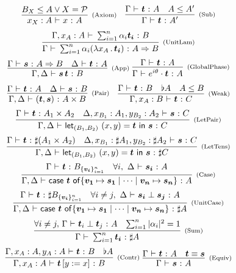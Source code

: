 \documentclass[runningheads,orivec]{llncs}
\newcommand\AbsBasis{\ensuremath{\mathcal{P}}}
\def\Pair#1#2{(#1,#2)} %
\def\Lam#1#2#3{\lambda#1_{#2}\,{.}\,#3} %
\def\letkeyword{\mathsf{let}}
\def\inkeyword{\mathsf{in}}
\def\LetP#1#2#3#4#5#6{\letkeyword_{\Pair{#2}{#4}}~\Pair{#1}{#3}=#5~\inkeyword~#6}
\def\gencase#1#2#3#4#5{\ensuremath{\mathsf{case}~#1~\mathsf{of} \{#2\mapsto #4 \mid \dotsb \mid #3\mapsto #5\}}}
\def\Arr{\Rightarrow}
\def\SUB#1#2{#1\le#2}
\def\TYP#1#2#3{#1~{\vdash}~#2~{:}~#3}
\def\SORTH#1#2#3#4{#1~{\vdash}~#2\perp#3~{:}~#4}
\def\snam#1{\textsc{\scriptsize\upshape(#1)}}
\newcommand\basis[1]{\ensuremath{B_{ #1 }}}
\newcommand\genbasis[3]{\ensuremath{B_{\{#1\}_{#2}^{#3}}}}
\begin{document}
\begin{table*}
    \small
    $
    \begin{array}{c}
    \infer[\snam{Axiom}]{\TYP{x_X:A}{x}{A}}{\basis{X}\leq A \vee X=\AbsBasis}\quad
    \infer[\snam{Sub}]{\TYP{\Gamma}{\vec{t}}{A'}}{
        \TYP{\Gamma}{\vec{t}}{A} & \SUB{A}{A'}
    }\\
    \noalign{\medskip}
    \infer[\snam{UnitLam}]{
        \TYP{\Gamma}{\sum_{i=1}^n \alpha_i (\Lam{x}{A}{\vec{t_i}})}{A\Arr B}
    }{\TYP{\Gamma,x_A: A}{\sum_{i=1}^{n}\alpha_i\vec{t_i}}{B}
    }\\
    \noalign{\medskip}
    \infer[\snam{App}]{\TYP{\Gamma,\Delta}{\vec{s}\,\vec{t}}{B}}{
        \TYP{\Gamma}{\vec{s}}{A\Arr B} & \TYP{\Delta}{\vec{t}}{A}
    }\ 
    \infer[\snam{GlobalPhase}]{\TYP{\Gamma}{e^{i\theta}\cdot\vec{t}}{A}}
    {\TYP{\Gamma}{\vec{t}}{A}}
    \\
    \noalign{\medskip}
    \infer[\snam{Pair}]{\TYP{\Gamma,\Delta}
        {\Pair{\vec{t}}{\vec{s}}}{A\times B}}{
        \TYP{\Gamma}{\vec{t}}{A}&\TYP{\Delta}{\vec{s}}{B}
    }\quad
    \infer[\snam{Weak}]{\TYP{\Gamma,x_A:B}{\vec{t}}{C}}{
        \TYP{\Gamma}{\vec{t}}{B}& \flat{A} & A\leq B
    }
    \\
    \noalign{\medskip}
    \infer[\snam{LetPair}]{\TYP{\Gamma,\Delta} 
        {\LetP{x}{B_1}{y}{B_2}{\vec{t}}{\vec{s}}}{C}}{
        \TYP{\Gamma}{\vec{t}}{A_1\times A_2}&
        \TYP{\Delta,x_{B_1}:A_1,y_{B_2}:A_2}{\vec{s}}{C}
    }\\
    \noalign{\medskip}
    \infer[\snam{LetTens}]{\TYP{\Gamma,\Delta}
        {\LetP{x}{B_1}{y}{B_2}{\vec{t}}{\vec{s}}}{\sharp C}}{
        \TYP{\Gamma}{\vec{t}}{\sharp(A_1\times A_2)}&
        \TYP{\Delta,x_{B_1}:\sharp A_1,y_{B_2}:\sharp A_2}{\vec{s}}{C}
    }\\
    \noalign{\medskip}
    \infer[\snam{Case}]{\TYP{\Gamma,\Delta}
        {\gencase{\vec{t}}{\vec{v_1}}{\vec{v_n}}{\vec{s_1}}{\vec{s_n}}}{A}}{
        \TYP{\Gamma}{\vec{t}}{\genbasis{\vec{v_i}}{i=1}{n}}&
        \forall i,\ \TYP{\Delta}{\vec{s_i}}{A}
    }\\
    \noalign{\medskip}
    \infer[\snam{UnitCase}]{\TYP{\Gamma,\Delta}
        {\gencase{\vec{t}}{\vec{v_1}}{\vec{v_n}}{\vec{s_1}}{\vec{s_n}}}{\sharp A}}{
        \TYP{\Gamma}{\vec{t}}{\sharp \genbasis{\vec{v_i}}{i=1}{n}}&
        \forall i\neq j,\ \SORTH{\Delta}{\vec{s_i}}{\vec{s_j}}{A}
    }\\
    \noalign{\medskip}
    \infer[\snam{Sum}]
        {\TYP{\Gamma}{\sum_{i=1}^{n} \vec{t_i}}{\sharp A}}
        {\forall i\neq j,\, \SORTH{\Gamma}{\vec t_i}{\vec t_j}{A} &
        \sum_{i=1}^{n}|\alpha_i|^2 = 1}
    \\
    \noalign{\medskip}
    \infer[\snam{Contr}]{\TYP{\Gamma,x_A:A}{\vec{t}\,[y:=x]}{B}}{
        \TYP{\Gamma,x_A:A,y_A:A}{\vec{t}}{B}&\flat{A}
    }\ 
    \infer[\snam{Equiv}]{\TYP{\Gamma}{\vec{s}}{A}}{
        \TYP{\Gamma}{\vec{t}}{A}& \vec t\equiv \vec s
    }\\
    \noalign{\medskip}
    \end{array}
    $


\end{table*}
\end{document}
